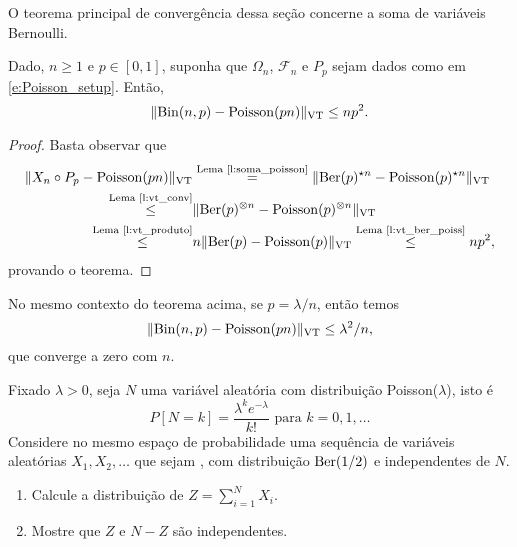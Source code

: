 \begin{topics}
O teorema principal de convergência dessa seção concerne a soma de variáveis Bernoulli.

\begin{theorem}
  \label{t:lei_peq_numeros}
  Dado, $n \geq 1$ e $p \in [0,1]$, suponha que $\Omega_n$, $\mathcal{F}_n$ e $P_p$ sejam dados como em \eqref{e:Poisson_setup}.
  Então,
  \begin{equation}
    \lVert \operatorname{Bin}(n,p) - \operatorname{Poisson}(pn) \rVert_{\operatorname{VT}} \leq n p^2.
  \end{equation}
\end{theorem}

\begin{proof}
  Basta observar que
  \begin{equation}
    \begin{split}
      \lVert X_n \circ P_p - \operatorname{Poisson}(pn) \rVert_{\operatorname{VT}} & \overset{\text{Lema~\ref{l:soma_poisson}}}= \lVert \operatorname{Ber}(p)^{\star n} - \operatorname{Poisson}(p)^{\star n} \rVert_{\operatorname{VT}}\\
      \overset{\text{Lema~\ref{l:vt_conv}}}\leq & \lVert \operatorname{Ber}(p)^{\otimes n} - \operatorname{Poisson}(p)^{\otimes n} \rVert_{\operatorname{VT}}\\
      \overset{\text{Lema~\ref{l:vt_produto}}}\leq & n \lVert \operatorname{Ber}(p) - \operatorname{Poisson}(p) \rVert_{\operatorname{VT}} \overset{\text{Lema~\ref{l:vt_ber_poiss}}}\leq n p^2,
    \end{split}
  \end{equation}
  provando o teorema.
\end{proof}

\begin{corollary}
  No mesmo contexto do teorema acima, se $p = \lambda/n$, então temos
  \begin{equation}
    \lVert \operatorname{Bin}(n,p) - \operatorname{Poisson}(pn) \rVert_{\operatorname{VT}} \leq \lambda^2 / n,
  \end{equation}
  que converge a zero com $n$.
\end{corollary}

\begin{exercise}
  Fixado $\lambda > 0$, seja $N$ uma variável aleatória com distribuição Poisson($\lambda$), isto é
  \begin{equation}
    P[N = k] = \frac{\lambda^k e^{-\lambda}}{k!} \text{ para $k = 0, 1, \dots$}
  \end{equation}
  Considere no mesmo espaço de probabilidade uma sequência de variáveis aleatórias $X_1, X_2, \dots$ que sejam \iid, com distribuição $\operatorname{Ber}(1/2)$ e independentes de $N$.
  \begin{enumerate}[\quad a)]
  \item Calcule a distribuição de $Z = \sum_{i=1}^N X_i$.
  \item Mostre que $Z$ e $N - Z$ são independentes.
  \end{enumerate}
\end{exercise}

\end{topics}

